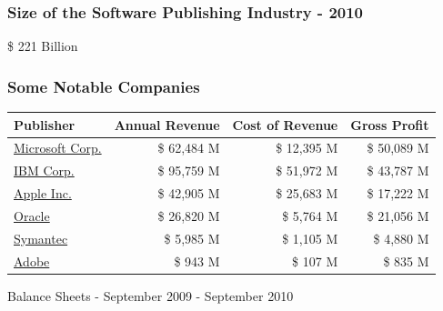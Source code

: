 \documentclass[18pt]{beamer}
\begin{document}
\begin{frame}
\frametitle{Size of the Software Publishing Industry - 2010}
\fontsize{72pt}{90pt}\selectfont
\begin{center}
\$ 221 Billion
\end{center}
\end{frame}


\begin{frame}
\frametitle{Some Notable Companies}

\begin{tabular}{lrrr}
\hline
\textbf{Publisher} &	\textbf{Annual Revenue} & \textbf{Cost of Revenue} & \textbf{Gross Profit} \\
\hline
\hline
\href{http://www.google.com/finance?fstype=ii\&q=NASDAQ:MSFT}{Microsoft Corp.}	& \$ 62,484 M & \$ 12,395 M  & \$ 50,089 M  \\
\hline
\href{http://www.google.com/finance?q=NYSE:IBM\&fstype=ii}{IBM Corp.} & \$ 95,759 M & \$ 51,972 M & \$ 43,787 M \\
\hline
\href{http://www.google.com/finance?q=NASDAQ:AAPL\&fstype=ii}{Apple Inc.} & \$ 42,905 M & \$ 25,683 M & \$ 17,222 M \\
\hline
\href{http://www.google.com/finance?q=NASDAQ:ORCL\&fstype=ii}{Oracle} & \$ 26,820 M & \$ 5,764 M & \$ 21,056 M \\
\hline
\href{http://www.google.com/finance?q=NASDAQ:SYMC\&fstype=ii}{Symantec}	&	\$ 5,985 M & \$ 1,105 M & \$ 4,880 M \\
\hline
\href{http://www.google.com/finance?q=NASDAQ:ADBE\&fstype=ii}{Adobe} & \$ 943 M & \$ 107 M & \$ 835 M \\
\hline
\end{tabular}

\bigskip
\begin{center}
Balance Sheets - September 2009 - September 2010
\end{center}

\end{frame}


{
\begin{frame}[plain]
\end{frame}
}
\end{document}
